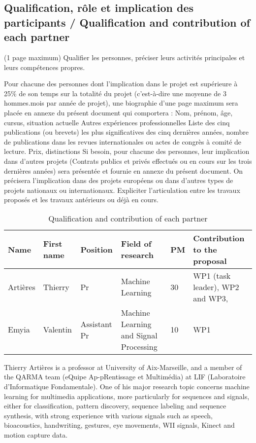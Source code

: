 \subsection{Qualification, rôle et implication des participants / Qualification and contribution of each partner}
\begin{xcomment}  
(1 page maximum)
Qualifier les personnes, pr\'eciser leurs activit\'es principales  et leurs comp\'etences propres.

Pour chacune des personnes dont l'implication dans le projet est sup\'erieure à 25\% de son temps sur la totalit\'e du projet (c'est-à-dire une moyenne de 3 hommes.mois par ann\'ee de projet), une biographie d'une page maximum sera plac\'ee en annexe du pr\'esent document qui comportera :
Nom, pr\'enom, âge, cursus, situation actuelle
Autres exp\'eriences professionnelles
Liste des cinq publications (ou brevets) les plus significatives des cinq derni\`eres ann\'ees, nombre de publications dans les revues internationales ou actes de congr\`es à comit\'e de lecture.
Prix, distinctions
Si besoin, pour chacune des personnes, leur implication dans d'autres projets (Contrats publics et priv\'es effectu\'es ou en cours sur les trois derni\`eres ann\'ees) sera pr\'esent\'ee et fournie en annexe du pr\'esent document. On pr\'ecisera l'implication dans des projets europ\'eens ou dans d'autres types de projets nationaux ou internationaux. Expliciter l'articulation entre les travaux propos\'es et les travaux ant\'erieurs ou d\'ejà en cours.

\end{xcomment}
\begin{table}
\begin{tabularx}{ \textwidth}{| p{2cm} | p{2cm} |  p{2cm} |  p{2cm} |  p{1cm} |  X |    }
\hline
Name & First name & Position & Field of research & PM & Contribution to the proposal \\
\hline
Arti\`eres& Thierry & Pr & Machine Learning & 30 & WP1 (task leader), WP2 and WP3, \\
\hline
Emyia & Valentin & Assistant Pr& Machine Learning and Signal Processing & 10 & WP1 \\
\hline

\end{tabularx}

\caption{Qualification and contribution of each partner}
\end{table}

Thierry Arti\`eres  is a professor at University of Aix-Marseille, and a member of the QARMA team (eQuipe Ap-pRentissage et Multim\'edia) at LIF (Laboratoire d'Informatique Fondamentale). One of his major research topic concerns machine learning for multimedia applications, more particularly for sequences and signals, either for classification, pattern discovery, sequence labeling and sequence synthesis, with strong experience with various signals such as speech, bioacoustics, handwriting, gestures, eye movements, WII signals, Kinect and motion capture data. 


